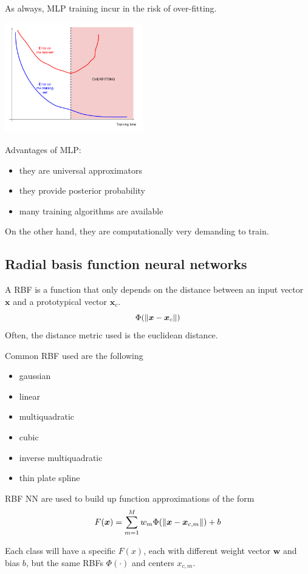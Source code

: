 \documentclass[oneside,onecolumn]{report}
\begin{document}
As always, MLP training incur in the risk of over-fitting.
\begin{center}
    \includegraphics[width=6cm]{mlp_overfitting.png}
\end{center}

Advantages of MLP:
\begin{itemize}
    \item they are universal approximators
    \item they provide posterior probability
    \item many training algorithms are available
\end{itemize}
On the other hand, they are computationally very demanding to train.


\subsection{Radial basis function neural networks}
A RBF is a function that only depends on the distance between an input vector $\bm x$ and a prototypical vector $\bm x_c$.
$$ \Phi(\norm{\bm x - \bm x_c}) $$
Often, the distance metric used is the euclidean distance.

Common RBF used are the following
\begin{itemize}
    \item gaussian
    \item linear
    \item multiquadratic
    \item cubic
    \item inverse multiquadratic
    \item thin plate spline
\end{itemize}

RBF NN are used to build up function approximations of the form
$$ F(\bm x) = \sum_{m = 1}^M w_m \Phi(\norm{\bm x - \bm x_{c,m}}) + b $$

Each class will have a specific $F(x)$, each with different weight vector $\bm w$ and bias $b$, but the same RBFs $\Phi(\cdot)$ and centers $x_{c,m}$.
\end{document}

